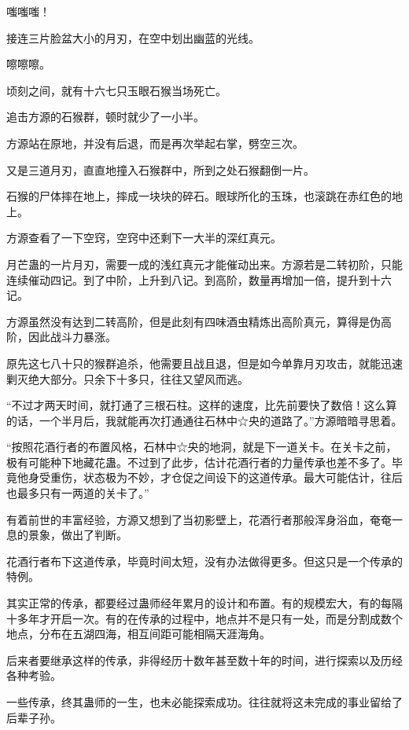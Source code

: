 
\begin{this_body}

嗤嗤嗤！

接连三片脸盆大小的月刃，在空中划出幽蓝的光线。

嚓嚓嚓。

顷刻之间，就有十六七只玉眼石猴当场死亡。

追击方源的石猴群，顿时就少了一小半。

方源站在原地，并没有后退，而是再次举起右掌，劈空三次。

又是三道月刃，直直地撞入石猴群中，所到之处石猴翻倒一片。

石猴的尸体摔在地上，摔成一块块的碎石。眼球所化的玉珠，也滚跳在赤红色的地上。

方源查看了一下空窍，空窍中还剩下一大半的深红真元。

月芒蛊的一片月刃，需要一成的浅红真元才能催动出来。方源若是二转初阶，只能连续催动四记。到了中阶，上升到八记。到高阶，数量再增加一倍，提升到十六记。

方源虽然没有达到二转高阶，但是此刻有四味酒虫精炼出高阶真元，算得是伪高阶，因此战斗力暴涨。

原先这七八十只的猴群追杀，他需要且战且退，但是如今单靠月刃攻击，就能迅速剿灭绝大部分。只余下十多只，往往又望风而逃。

“不过才两天时间，就打通了三根石柱。这样的速度，比先前要快了数倍！这么算的话，一个半月后，我就能再次打通通往石林中☆央的道路了。”方源暗暗寻思着。

“按照花酒行者的布置风格，石林中☆央的地洞，就是下一道关卡。在关卡之前，极有可能种下地藏花蛊。不过到了此步，估计花酒行者的力量传承也差不多了。毕竟他身受重伤，状态极为不妙，才仓促之间设下的这道传承。最大可能估计，往后也最多只有一两道的关卡了。”

有着前世的丰富经验，方源又想到了当初影壁上，花酒行者那般浑身浴血，奄奄一息的景象，做出了判断。

花酒行者布下这道传承，毕竟时间太短，没有办法做得更多。但这只是一个传承的特例。

其实正常的传承，都要经过蛊师经年累月的设计和布置。有的规模宏大，有的每隔十多年才开启一次。有的在传承的过程中，地点并不是只有一处，而是分割成数个地点，分布在五湖四海，相互间距可能相隔天涯海角。

后来者要继承这样的传承，非得经历十数年甚至数十年的时间，进行探索以及历经各种考验。

一些传承，终其蛊师的一生，也未必能探索成功。往往就将这未完成的事业留给了后辈子孙。


\end{this_body}
